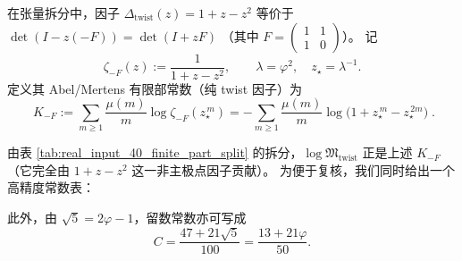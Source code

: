 \begin{definition}\label{def:real-input-40-artin-sign-mertens}
在张量拆分中，因子
\(
\Delta_{\mathrm{twist}}(z)=1+z-z^2
\)
等价于
\(
\det(I-z(-F))=\det(I+zF)
\)
（其中 \(F=\begin{pmatrix}1&1\\1&0\end{pmatrix}\)）。
记
\[
\zeta_{-F}(z):=\frac{1}{1+z-z^2},
\qquad
\lambda=\varphi^2,\quad z_\star=\lambda^{-1}.
\]
定义其 Abel/Mertens 有限部常数（纯 twist 因子）为
\[
\boxed{\;
K_{-F}
:=\sum_{m\ge 1}\frac{\mu(m)}{m}\log\zeta_{-F}(z_\star^{\,m})
=-\sum_{m\ge 1}\frac{\mu(m)}{m}\log\!\bigl(1+z_\star^{\,m}-z_\star^{\,2m}\bigr)\; }.
\]
\end{definition}

\begin{remark}\label{rem:real-input-40-artin-sign-mertens-value}
由表 \ref{tab:real_input_40_finite_part_split} 的拆分，\(\log\mathfrak{M}_{\mathrm{twist}}\) 正是上述 \(K_{-F}\)（它完全由 \(1+z-z^2\) 这一非主极点因子贡献）。
为便于复核，我们同时给出一个高精度常数表：

\end{remark}

此外，由 $\sqrt5=2\varphi-1$，留数常数亦可写成
\[
C=\frac{47+21\sqrt5}{100}=\frac{13+21\varphi}{50}.
\]

